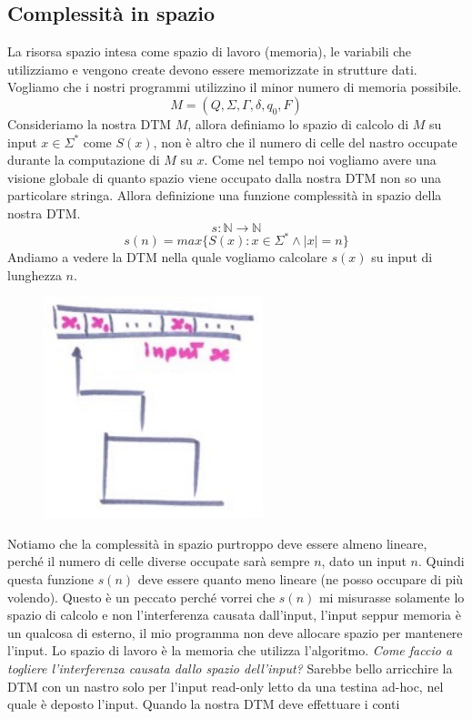 \documentclass{article}
\begin{document}
\subsection{Complessità in spazio}
La risorsa spazio intesa come spazio di lavoro (memoria), le variabili che utilizziamo e vengono
create devono essere memorizzate in strutture dati. Vogliamo che i nostri programmi utilizzino
il minor numero di memoria possibile.
$$M=(Q,\Sigma,\Gamma,\delta,q_0,F)$$
Consideriamo la nostra DTM $M$, allora definiamo lo spazio di calcolo di $M$ su input $x\in\Sigma^*$
come $S(x)$, non è altro che il numero di celle del nastro occupate durante la computazione
di $M$ su $x$. Come nel tempo noi vogliamo avere una visione globale di quanto spazio viene
occupato dalla nostra DTM non so una particolare stringa. Allora definizione una funzione
complessità in spazio della nostra DTM.
$$s:\mathbb{N}\rightarrow\mathbb{N}$$
$$s(n)=max\{S(x):x\in\Sigma^*\land|x|=n\}$$
Andiamo a vedere la DTM nella quale vogliamo calcolare $s(x)$ su input di lunghezza $n$.
\begin{figure}[H]
    \centering
    \includegraphics[scale=0.6]{images/computazione_DTM.png}
\end{figure}
Notiamo che la complessità in spazio purtroppo deve essere almeno lineare, perché il numero
di celle diverse occupate sarà sempre $n$, dato un input $n$. Quindi questa funzione $s(n)$
deve essere quanto meno lineare (ne posso occupare di più volendo). Questo è un peccato
perché vorrei che $s(n)$ mi misurasse solamente lo spazio di calcolo e non l'interferenza
causata dall'input, l'input seppur memoria è un qualcosa di esterno, il mio programma
non deve allocare spazio per mantenere l'input. Lo spazio di lavoro è la memoria che utilizza
l'algoritmo. \textit{Come faccio a togliere l'interferenza causata dallo spazio
    dell'input?} Sarebbe bello arricchire la DTM con un nastro solo per l'input read-only letto
da una testina ad-hoc, nel quale è deposto l'input. Quando la nostra DTM deve effettuare i conti
\end{document}
